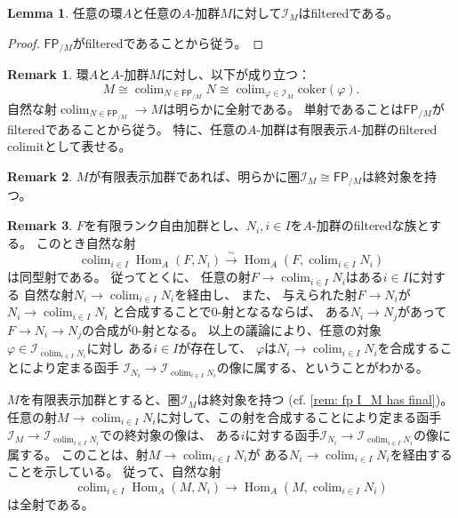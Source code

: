 \documentclass[uplatex]{jsarticle}
\theoremstyle{definition}
\newtheorem{lem}[lem]{Lemma}
\newtheorem{rem}[rem]{Remark}
\theoremstyle{plain}
\DeclareMathOperator{\Hom}{\mathrm{Hom}}
\newcommand{\coker}{\mathrm{coker}}
\DeclareMathOperator{\colim}{\mathrm{colim}}
\newcommand{\FP}[1]{\mathsf{FP}_{/#1}}
\newcommand{\mcI}{\mathcal{I}}
\begin{document}
\begin{lem}\label{lem: I_M filtered}
  任意の環\(A\)と任意の\(A\)-加群\(M\)に対して\(\mcI_M\)はfilteredである。
\end{lem}

\begin{proof}
  \(\FP{M}\)がfilteredであることから従う。
\end{proof}


\begin{rem}
  環\(A\)と\(A\)-加群\(M\)に対し、以下が成り立つ：
  \[
  M\cong \colim_{N\in \FP{M}} N
  \cong \colim_{\varphi\in \mcI_M}\coker(\varphi).
  \]
  自然な射\(\colim_{N\in\FP{M}}\to M\)は明らかに全射である。
  単射であることは\(\FP{M}\)がfilteredであることから従う。
  特に、任意の\(A\)-加群は有限表示\(A\)-加群のfiltered colimitとして表せる。
\end{rem}


\begin{rem}\label{rem: fp I_M has final}
  \(M\)が有限表示加群であれば、明らかに圏\(\mcI_M\cong \FP{M}\)は終対象を持つ。
\end{rem}


\begin{rem}\label{rem: fp colim surj}
  \(F\)を有限ランク自由加群とし、\(N_i,i\in I\)を\(A\)-加群のfilteredな族とする。
  このとき自然な射
  \[
  \colim_{i\in I}\Hom_A(F,N_i) \xrightarrow{\sim} \Hom_A(F,\colim_{i\in I}N_i)
  \]
  は同型射である。
  従ってとくに、
  任意の射\(F\to \colim_{i\in I}N_i\)はある\(i\in I\)に対する
  自然な射\(N_i\to \colim_{i\in I}N_i\)を経由し、
  また、
  与えられた射\(F\to N_i\)が\(N_i\to \colim_{i\in I}N_i\)
  と合成することで\(0\)-射となるならば、
  ある\(N_i\to N_j\)があって\(F\to N_i\to N_j\)の合成が\(0\)-射となる。
  以上の議論により、任意の対象\(\varphi\in \mcI_{\colim_{i\in I}N_i}\)に対し
  ある\(i\in I\)が存在して、
  \(\varphi\)は\(N_i\to \colim_{i\in I}N_i\)を合成することにより定まる函手
  \(\mcI_{N_i}\to \mcI_{\colim_{i\in I}N_i}\)の像に属する、ということがわかる。

  \(M\)を有限表示加群とすると、圏\(\mcI_M\)は終対象を持つ
  (cf. \autoref{rem: fp I_M has final})。
  任意の射\(M\to \colim_{i\in I}N_i\)に対して、この射を合成することにより定まる函手
  \(\mcI_M\to \mcI_{\colim_{i\in I}N_i}\)での終対象の像は、
  ある\(i\)に対する函手\(\mcI_{N_i}\to \mcI_{\colim_{i\in I}N_i}\)の像に属する。
  このことは、射\(M\to \colim_{i\in I}N_i\)が
  ある\(N_i\to \colim_{i\in I}N_i\)を経由することを示している。
  従って、自然な射
  \[
  \colim_{i\in I}\Hom_A(M,N_i)\to \Hom_A(M,\colim_{i\in I}N_i)
  \]
  は全射である。
\end{rem}
\end{document}
